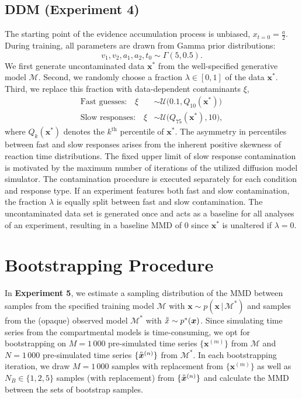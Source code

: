 \documentclass[twoside,11pt]{article}
\newcommand{\observed}[1]{\protect\accentset{\text{o}}{#1}}%
\newcommand{\numberDDM}{4}
\newcommand{\numberCovid}{5}
\newcommand{\x}{\boldsymbol{x}}
\newcommand{\0}{\boldsymbol{0}}
\newcommand{\given}{\,|\,}
\newcommand{\M}{\mathcal{M}}
\renewcommand{\cite}[1]{\citep{#1}}
\begin{document}
\subsection{DDM (Experiment \numberDDM)}\label{sec:app:ddm}
The starting point of the evidence accumulation process is unbiased, $x_{t=0}=\frac{a}{2}$.
During training, all parameters are drawn from Gamma prior distributions:
\begin{equation}
    v_1, v_2, a_1, a_2, t_0 \sim\Gamma(5, 0.5).
\end{equation}
We first generate uncontaminated data $\x^*$ from the well-specified generative model $\M$. 
Second, we randomly choose a fraction $\lambda\in[0,1]$ of the data $\x^*$.
Third, we replace this fraction with data-dependent contaminants $\xi$,
\begin{equation}
    \begin{aligned}
    \text{Fast guesses:}\quad\xi & \sim\mathcal{U}\big(0.1, Q_{10}(\x^*)\big)\\
    \text{Slow responses:}\quad\xi & \sim\mathcal{U}\big(Q_{75}(\x^*), 10\big),
    \end{aligned}
\end{equation}
where $Q_k(\x^*)$ denotes the $k^{\text{th}}$ percentile of $\x^*$.
The asymmetry in percentiles between fast and slow responses arises from the inherent positive skewness of reaction time distributions. 
The fixed upper limit of slow response contamination is motivated by the maximum number of iterations of the utilized diffusion model simulator. 
The contamination procedure is executed separately for each condition and response type. 
If an experiment features both fast and slow contamination, the fraction $\lambda$ is equally split between fast and slow contamination. 
The uncontaminated data set is generated once and acts as a baseline for all analyses of an experiment, resulting in a baseline MMD of 0 since $\x^*$ is unaltered if $\lambda=0$.

\section{Bootstrapping Procedure}
\label{sec:app:bootstrap}
In \textbf{Experiment \numberCovid}, we estimate a sampling distribution of the MMD between samples from the specified training model $\M$ with $\x\sim p(\x\given\M^*)$ and samples from the (opaque) observed model $\M^*$ with $\observed{x}\sim p^*(\x)$.
Since simulating time series from the compartmental models is time-consuming, we opt for bootstrapping \cite{Stine1989} on $M=1\,000$ pre-simulated time series $\{\x^{(m)}\}$ from $\mathcal{M}$ and $N=1\,000$ pre-simulated time series $\{\observed{\x}^{(n)}\}$ from $\M^*$.
In each bootstrapping iteration, we draw $M=1\,000$ samples with replacement from $\{\x^{(m)}\}$ as well as $N_B\in\{1,2,5\}$ samples (with replacement) from $\{\observed{\x}^{(n)}\}$ and calculate the MMD between the sets of bootstrap samples.
\end{document}
